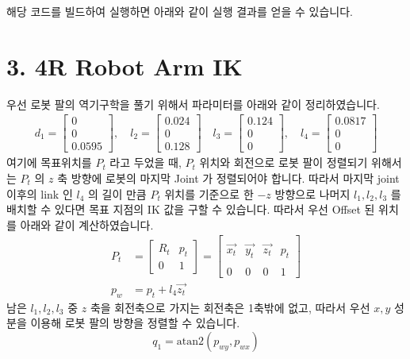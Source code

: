 \documentclass{article}
\begin{document}
해당 코드를 빌드하여 실행하면 아래와 같이 실행 결과를 얻을 수 있습니다.

\section*{3. 4R Robot Arm IK}
우선 로봇 팔의 역기구학을 풀기 위해서 파라미터를 아래와 같이 정리하였습니다. 
\begin{align*}
d_{1} = \begin{bmatrix}
0 \\ 0 \\ 0.0595
\end{bmatrix}, \quad l_{2} = \begin{bmatrix}
0.024 \\ 0 \\ 0.128
\end{bmatrix}\quad l_{3} = \begin{bmatrix}
0.124 \\ 0 \\ 0
\end{bmatrix}, \quad l_{4} = \begin{bmatrix}
0.0817 \\ 0 \\ 0
\end{bmatrix}
\end{align*}
여기에 목표위치를 $P_{t}$ 라고 두었을 때, $P_{t}$ 위치와 회전으로 로봇 팔이 정렬되기 위해서는 $P_{t}$ 의 $z$ 축 방향에 로봇의 마지막 Joint 가 정렬되어야 합니다. 따라서 마지막 joint 이후의 link 인 $l_{4}$ 의 길이 만큼 $P_{t}$ 위치를 기준으로 한 $-z$ 방향으로 나머지 $l_{1}, l_{2}, l_{3}$ 를 배치할 수 있다면 목표 지점의 IK 값을 구할 수 있습니다.
따라서 우선 Offset 된 위치를 아래와 같이 계산하였습니다. 
\begin{align*}
    P_{t} &= \begin{bmatrix}
        R_{t}& p_{t} \\
        0 & 1
    \end{bmatrix} = \begin{bmatrix}
        & & & \\
        \vec{x_{t}} & \vec{y_{t}} & \vec{z_{t}} & p_{t} \\
        & & &  \\
        0 & 0 & 0 & 1
    \end{bmatrix} \\
    p_{w} &= p_{t} + l_{4}\vec{z_{t}}
\end{align*}
남은 $l_{1}, l_{2}, l_{3}$ 중 $z$ 축을 회전축으로 가지는 회전축은 1축밖에 없고, 따라서 우선 $x, y$ 성분을 이용해 로봇 팔의 방향을 정렬할 수 있습니다. $$q_{1} = \text{atan2}(p_{wy}, p_{wx})$$
\end{document}
